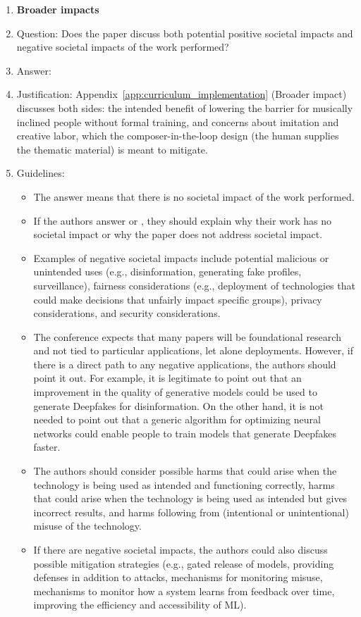 \documentclass{article}
\begin{document}
\begin{enumerate}
\item {\bf Broader impacts}
    \item[] Question: Does the paper discuss both potential positive societal impacts and negative societal impacts of the work performed?
    \item[] Answer: \answerYes{}
    \item[] Justification: Appendix~\ref{app:curriculum_implementation} (Broader impact) discusses both sides: the intended benefit of lowering the barrier for musically inclined people without formal training, and concerns about imitation and creative labor, which the composer-in-the-loop design (the human supplies the thematic material) is meant to mitigate.
    \item[] Guidelines:
    \begin{itemize}
        \item The answer \answerNA{} means that there is no societal impact of the work performed.
        \item If the authors answer \answerNA{} or \answerNo, they should explain why their work has no societal impact or why the paper does not address societal impact.
        \item Examples of negative societal impacts include potential malicious or unintended uses (e.g., disinformation, generating fake profiles, surveillance), fairness considerations (e.g., deployment of technologies that could make decisions that unfairly impact specific groups), privacy considerations, and security considerations.
        \item The conference expects that many papers will be foundational research and not tied to particular applications, let alone deployments. However, if there is a direct path to any negative applications, the authors should point it out. For example, it is legitimate to point out that an improvement in the quality of generative models could be used to generate Deepfakes for disinformation. On the other hand, it is not needed to point out that a generic algorithm for optimizing neural networks could enable people to train models that generate Deepfakes faster.
        \item The authors should consider possible harms that could arise when the technology is being used as intended and functioning correctly, harms that could arise when the technology is being used as intended but gives incorrect results, and harms following from (intentional or unintentional) misuse of the technology.
        \item If there are negative societal impacts, the authors could also discuss possible mitigation strategies (e.g., gated release of models, providing defenses in addition to attacks, mechanisms for monitoring misuse, mechanisms to monitor how a system learns from feedback over time, improving the efficiency and accessibility of ML).
    \end{itemize}
    

\end{enumerate}
\end{document}
